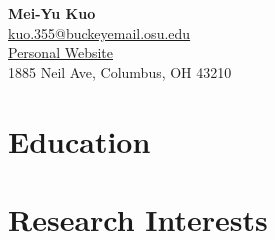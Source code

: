 \documentclass[11pt]{article} %
\newcommand{\mytitle}[4]{
  \begin{center}
    \setstretch{1.1} %
    \Large\textbf{#1}\normalsize \\[2pt] %
    \href{mailto:#2}{#2} \\[2pt] %
    #3 \\[2pt] %
    #4 %
  \end{center}
}
\begin{document}
\mytitle{Mei-Yu Kuo}{kuo.355@buckeyemail.osu.edu}{\href{https://meisbase.github.io/}{Personal Website}}{1885 Neil Ave, Columbus, OH 43210} %


\RaggedRight


\section*{Education}



\section*{Research Interests}
\label{interests}




\normalsize


    
\end{document}
